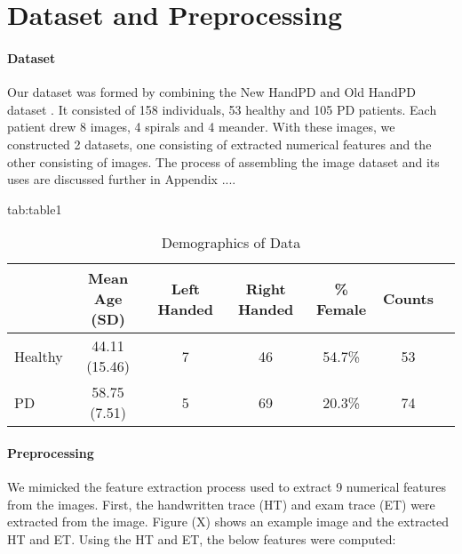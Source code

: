 \documentclass[pmlr,twocolumn,10pt]{jmlr} %
\begin{document}
\section{Dataset and Preprocessing}
\label{sec:Dataset+Preprocessing}

\paragraph{Dataset}
\label{sec:Dataset} Our dataset was formed by combining the New HandPD and Old HandPD dataset \citep{pereira2016new}. It consisted of 158 individuals, 53 healthy and 105 PD patients. Each patient drew 8 images, 4 spirals and 4 meander. With these images, we constructed 2 datasets, one consisting of extracted numerical features and the other consisting of images. The process of assembling the image dataset and its uses are discussed further in Appendix ....

\begin{table*}[hbtp]
\centering 
\floatconts
{tab:table1}
{\caption{Demographics of Data}} 
    {
        \begin{tabular}{lcccccc}
        \toprule
        \bfseries & \bfseries Mean Age (SD) & \bfseries Left Handed & \bfseries Right Handed & \bfseries \% Female & \bfseries Counts \\
        \midrule
        Healthy & 44.11 (15.46) & 7 & 46 & 54.7\% & 53 \\
        PD & 58.75 (7.51) & 5 & 69 & 20.3\% & 74 \\
        \bottomrule
        \end{tabular}
    }
\end{table*}

\paragraph{Preprocessing}
\label{sec:Preprocessing} 
We mimicked the feature extraction process used \citep{pereira2016new} to extract 9 numerical features from the images. First, the handwritten trace (HT) and exam trace (ET) were extracted from the image. Figure (X) shows an example image and the extracted HT and ET.  Using the HT and ET, the below features were computed:
\end{document}
